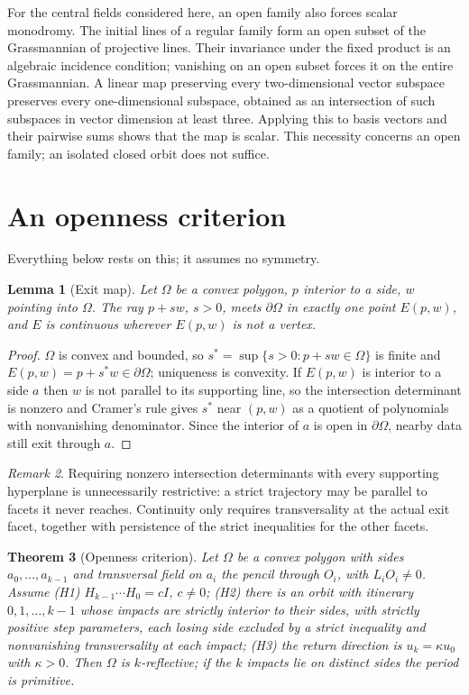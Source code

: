 \documentclass[11pt,a4paper]{article}
\theoremstyle{plain}
\newtheorem{theorem}{Theorem}[section]
\newtheorem{lemma}[theorem]{Lemma}
\theoremstyle{definition}
\theoremstyle{remark}
\newtheorem{remark}[theorem]{Remark}
\begin{document}
For the central fields considered here, an open family also forces scalar
monodromy. The initial lines of a regular family form an open subset of the
Grassmannian of projective lines. Their invariance under the fixed product
is an algebraic incidence condition; vanishing on an open subset forces
it on the entire Grassmannian. A linear map preserving every two-dimensional
vector subspace preserves every one-dimensional subspace, obtained as an
intersection of such subspaces in vector dimension at least three.
Applying this to basis vectors and their pairwise sums shows that the map
is scalar. This necessity concerns an open family; an isolated closed orbit
does not suffice.

\section{An openness criterion}

Everything below rests on this; it assumes no symmetry.

\begin{lemma}[Exit map]\label{lem:exit}
Let $\Omega$ be a convex polygon, $p$ interior to a side, $w$ pointing into
$\Omega$. The ray $p+sw$, $s>0$, meets $\partial\Omega$ in exactly one point $E(p,w)$, and
$E$ is continuous wherever $E(p,w)$ is not a vertex.
\end{lemma}

\begin{proof}
$\Omega$ is convex and bounded, so $s^\ast=\sup\{s>0:p+sw\in\Omega\}$ is finite and
$E(p,w)=p+s^\ast w\in\partial\Omega$; uniqueness is convexity. If $E(p,w)$ is
interior to a side $a$ then $w$ is not parallel to its supporting line, so the
intersection determinant is nonzero and Cramer's rule gives $s^\ast$ near $(p,w)$
as a quotient of polynomials with nonvanishing denominator. Since the interior of
$a$ is open in $\partial\Omega$, nearby data still exit through $a$.
\end{proof}

\begin{remark}
Requiring nonzero intersection determinants with every supporting hyperplane is unnecessarily restrictive: a strict trajectory may be parallel to facets it never reaches. Continuity only requires transversality at the actual exit facet, together with persistence of the strict inequalities for the other facets.
\end{remark}

\begin{theorem}[Openness criterion]\label{thm:open}
Let $\Omega$ be a convex polygon with sides $a_0,\dots,a_{k-1}$ and transversal
field on $a_i$ the pencil through $O_i$, with $L_iO_i\neq0$. Assume
\textup{(H1)} $H_{k-1}\cdots H_0=cI$, $c\neq0$; \textup{(H2)} there is an orbit
with itinerary $0,1,\dots,k-1$ whose impacts are strictly interior to their sides,
with strictly positive step parameters, each losing side excluded by a strict
inequality and nonvanishing transversality at each impact; \textup{(H3)} the return
direction is $u_k=\kappa u_0$ with $\kappa>0$. Then $\Omega$ is $k$-reflective; if
the $k$ impacts lie on distinct sides the period is primitive.
\end{theorem}
\end{document}
